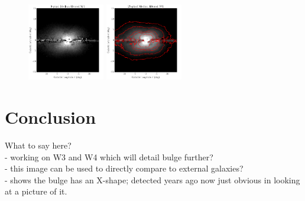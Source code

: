 \documentclass[12pt, preprint]{aastex}
\begin{document}
\begin{figure}
\centering
\includegraphics[width=0.3\textwidth]{xbulge-05}
\includegraphics[width=0.3\textwidth]{xbulge-07}
\caption{
}
\label{fig:contours}
\end{figure}


\section{Conclusion}

What to say here?\\
- working on W3 and W4 which will detail bulge further?\\
- this image can be used to directly compare to external galaxies? \\
- shows the bulge has an X-shape; detected years ago now just obvious in looking at a picture of it. \\




\end{document}
